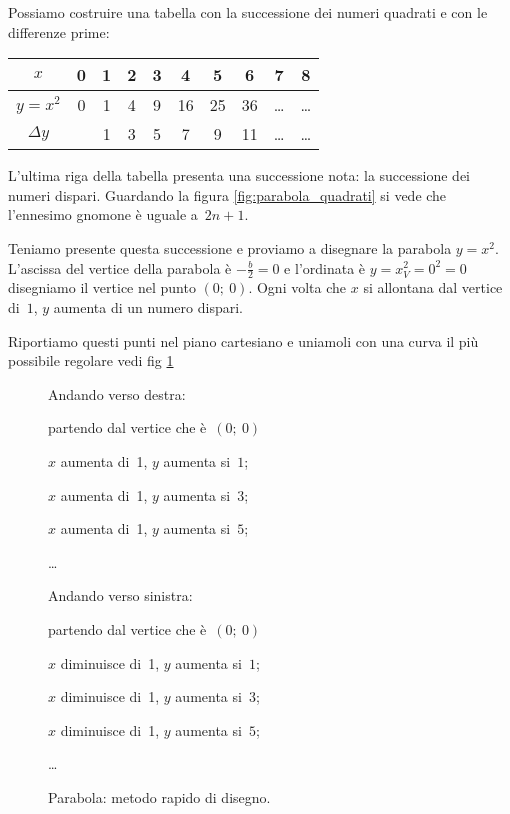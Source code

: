 Possiamo costruire una tabella con la successione dei numeri quadrati e con 
le differenze prime:

\begin{center}
  \begin{tabular}{c c c c c c c c c c}
   $x$        & 0 & 1 & 2 & 3 & 4 & 5 & 6 & 7 & 8 \\
   \hline
   $y=x^2$    & 0 & 1 & 4 & 9 & 16 & 25 & 36 & \ldots & \ldots \\
   \hline
   $\Delta y$ &  & 1 & 3 & 5 & 7 & 9 & 11 & \ldots & \ldots \\
  \end{tabular}
\end{center}
L'ultima riga della tabella presenta una successione nota: la successione dei 
numeri dispari. Guardando la figura \ref{fig:parabola_quadrati} si vede che 
l'ennesimo gnomone è uguale a~$2n+1$. 

Teniamo presente questa successione e proviamo a disegnare la parabola $y=x^2$.
L'ascissa del vertice della parabola è $-\frac{b}{2}=0$ e l'ordinata è 
$y=x_V^2=0^2=0$ disegniamo il vertice nel punto $(0;~0)$. Ogni volta che $x$ 
si allontana dal vertice di~$1$, $y$ aumenta di un numero dispari. 

Riportiamo questi punti nel piano cartesiano e uniamoli con una curva il più 
possibile regolare vedi fig \ref{fig:parabola_parabola0}


\begin{figure}[p]
\begin{minipage}{.50\textwidth}
Andando verso destra:
 \begin{itemize*}
 \item partendo dal vertice che è~$(0;~0)$
 \item $x$ aumenta di~1, $y$ aumenta si~$1$;
 \item $x$ aumenta di~1, $y$ aumenta si~$3$;
 \item $x$ aumenta di~1, $y$ aumenta si~$5$;
 \item \dots
\end{itemize*}
Andando verso sinistra:
\begin{itemize*}
 \item partendo dal vertice che è~$(0;~0)$
 \item $x$ diminuisce di~1, $y$ aumenta si~$1$;
 \item $x$ diminuisce di~1, $y$ aumenta si~$3$;
 \item $x$ diminuisce di~1, $y$ aumenta si~$5$;
 \item \dots
\end{itemize*}
\end{minipage}
\begin{minipage}{.50\textwidth}
\begin{inaccessibleblock}[Parabola di equazione $y=x^2$.]
\centering
  
  \caption{Parabola: metodo rapido di disegno.} \label{fig:parabola_parabola0}
\end{inaccessibleblock}
\end{minipage}
\end{figure}

